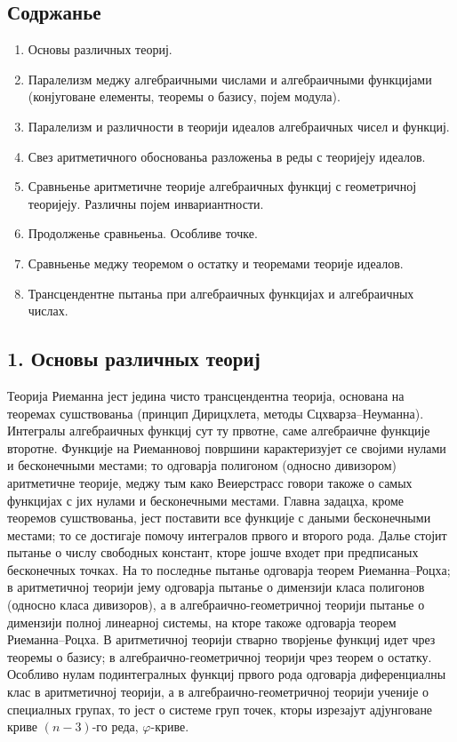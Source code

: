 ﻿\documentclass[11pt]{article}
\begin{document}
\subsection*{Содржанье}
\begin{enumerate}
\item Основы различных теориј.
\item Паралелизм меджу алгебраичными числами и алгебраичными функцијами (конјуговане елементы, теоремы о базису, појем модула).
\item Паралелизм и различности в теорији идеалов алгебраичных чисел и функциј.
\item Свез аритметичного обоснованьа разложеньа в реды с теоријеју идеалов.
\item Сравньенье аритметичне теорије алгебраичных функциј с геометричној теоријеју. Различны појем инвариантности.
\item Продолженье сравньеньа. Особливе точке.
\item Сравньенье меджу теоремом о остатку и теоремами теорије идеалов.
\item Трансцендентне пытаньа при алгебраичных функцијах и алгебраичных числах.
\end{enumerate}

\subsection*{1. Основы различных теориј}
Теорија Риеманна јест једина чисто трансцендентна теорија, основана на теоремах сушствованьа (принцип Дирицхлета, методы Сцхварза--Неуманна). Интегралы алгебраичных функциј сут ту првотне, саме алгебраичне функције второтне. Функције на Риеманновој површини карактеризујет се својими нулами и бесконечными местами; то одговарја полигоном (односно дивизором) аритметичне теорије, меджу тым како Веиерстрасс говори такоже о самых функцијах с јих нулами и бесконечными местами. Главна задацха, кроме теоремов сушствованьа, јест поставити все функције с даными бесконечными местами; то се достигаје помочу интегралов првого и второго рода. Далье стојит пытанье о числу свободных констант, кторе јошче входет при предписаных бесконечных точках. На то последнье пытанье одговарја теорем Риеманна--Роцха; в аритметичној теорији јему одговарја пытанье о димензији класа полигонов (односно класа дивизоров), а в алгебраично-геометричној теорији пытанье о димензији полној линеарној системы, на кторе такоже одговарја теорем Риеманна--Роцха. В аритметичној теорији стварно творјенье функциј идет чрез теоремы о базису; в алгебраично-геометричној теорији чрез теорем о остатку. Особливо нулам подинтегралных функциј првого рода одговарја диференциалны клас в аритметичној теорији, а в алгебраично-геометричној теорији ученије о специалных групах, то јест о системе груп точек, кторы изрезајут адјунговане криве \((n-3)\)-го реда, \(\varphi\)-криве.
\end{document}

